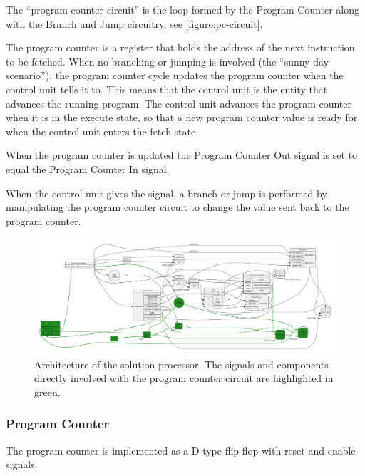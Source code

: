 The ``program counter circuit'' is the loop formed by the Program Counter along with the Branch and Jump circuitry, see \vref{figure:pc-circuit}.

The program counter is a register that holds the address of the next instruction to be fetched.
When no branching or jumping is involved (the ``sunny day scenario''), the program counter cycle updates the program counter when the control unit tells it to.
This means that the control unit is the entity that advances the running program.
The control unit advances the program counter when it is in the execute state, so that a new program counter value is ready for when the control unit enters the fetch state.

When the program counter is updated the Program Counter Out signal is set to equal the Program Counter In signal.

When the control unit gives the signal, a branch or jump is performed by manipulating the program counter circuit to change the value sent back to the program counter.

\begin{figure}[h!]
	\begin{center}
		\includegraphics[keepaspectratio, height=\textheight, width=\textwidth]{graphics/cpu-architecture/cpu-arc-pc-circuit.pdf}
		\caption{Architecture of the solution processor. The signals and components directly involved with the program counter circuit are highlighted in green.}
		\label{figure:pc-circuit}
	\end{center}
\end{figure}


\subsubsection{Program Counter}

The program counter is implemented as a D-type flip-flop with reset and enable signals.


